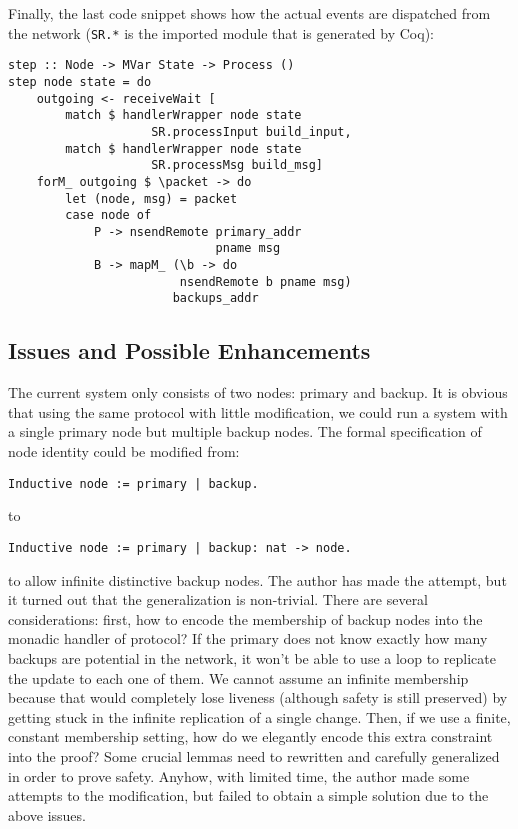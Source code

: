 \documentclass[twocolumn]{article}
\begin{document}
Finally, the last code snippet shows how the actual events are dispatched from the
network (\texttt{SR.*} is the imported module that is generated by Coq):
\begin{center}
\small
\begin{verbatim}
step :: Node -> MVar State -> Process ()
step node state = do
    outgoing <- receiveWait [
        match $ handlerWrapper node state
                    SR.processInput build_input,
        match $ handlerWrapper node state
                    SR.processMsg build_msg]
    forM_ outgoing $ \packet -> do
        let (node, msg) = packet
        case node of
            P -> nsendRemote primary_addr
                             pname msg
            B -> mapM_ (\b -> do
                        nsendRemote b pname msg)
                       backups_addr
\end{verbatim}
\end{center}
\subsection{Issues and Possible Enhancements}
The current system only consists of two nodes: primary and backup. It is
obvious that using the same protocol with little modification, we could run a
system with a single primary node but multiple backup nodes. The formal
specification of node identity could be modified from:
\begin{center}
\small
\begin{verbatim}
Inductive node := primary | backup.
\end{verbatim}
\end{center}
to
\begin{center}
\small
\begin{verbatim}
Inductive node := primary | backup: nat -> node.
\end{verbatim}
\end{center}
to allow infinite distinctive backup nodes. The author has made the attempt,
but it turned out that the generalization is non-trivial. There are several
considerations: first, how to encode the membership of backup nodes into the
monadic handler of protocol? If the primary does not know exactly how many
backups are potential in the network, it won't be able to use a loop to
replicate the update to each one of them. We cannot assume an infinite
membership because that would completely lose liveness (although safety is still
preserved) by getting stuck in the infinite replication of a single change. Then, if we
use a finite, constant membership setting, how do we elegantly encode this
extra constraint into the proof? Some crucial lemmas need to rewritten and carefully
generalized in order to prove safety. Anyhow, with limited time, the
author made some attempts to the modification, but failed to obtain a simple
solution due to the above issues.
\end{document}
